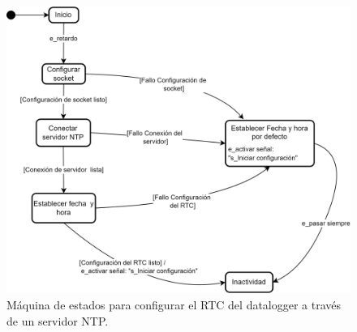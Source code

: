 


\begin{figure}[H]
    \centering
    \includegraphics[width=0.85\linewidth]{Figuras/datalogger/Firmware/sc_configRTC.png}
    \caption{Máquina de estados para configurar el RTC del datalogger a través de un servidor NTP.}
    \label{fig:sc_configRTC}
\end{figure}


